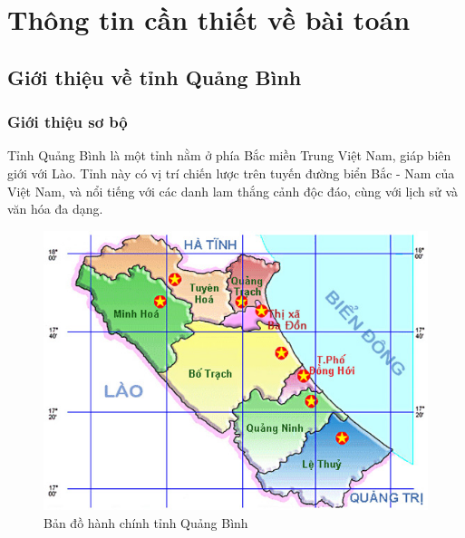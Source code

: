 \documentclass[12pt]{report}
\begin{document}
\tableofcontents

\newpage

\chapter{Thông tin cần thiết về bài toán}
\section{Giới thiệu về tỉnh Quảng Bình} %

\subsection{Giới thiệu sơ bộ}
\begin{flushleft}
	Tỉnh Quảng Bình là một tỉnh nằm ở phía Bắc miền Trung Việt Nam, giáp biên giới với Lào. Tỉnh này có vị trí chiến lược trên tuyến đường biển Bắc - Nam của Việt Nam, và nổi tiếng với các danh lam thắng cảnh độc đáo, cùng với lịch sử và văn hóa đa dạng.
	\\[\baselineskip]

	\begin{figure}[h!]
		\centering
		\includegraphics[width = \textwidth]{images/BandoQB.png}
		\caption{Bản đồ hành chính tỉnh Quảng Bình}
	\end{figure}
\end{flushleft}

\newpage
\end{document}
